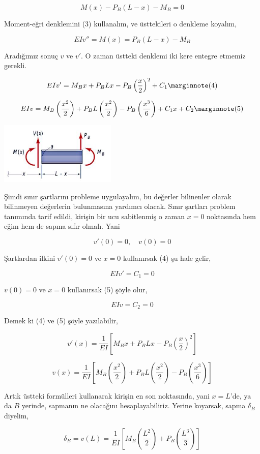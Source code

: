 \documentclass[12pt,fleqn]{article}\usepackage{../../common}
\begin{document}
$$
M(x) - P_B(L-x) - M_B = 0
$$

Moment-eğri denklemini (3) kullanalım, ve üsttekileri o denkleme koyalım,

$$
EIv'' = M(x) = P_B(L-x) - M_B
$$

Aradığımız sonuç $v$ ve $v'$. O zaman üstteki denklemi iki kere entegre etmemiz
gerekli.

$$
EI v' = M_B x + P_B Lx - P_B \left( \frac{x}{2} \right)^2 + C_1
\mlabel{4}
$$

$$
EIv = M_B \left( \frac{x^2}{2} \right) +
P_B L  \left( \frac{x^2}{2} \right) -
P_B \left( \frac{x^3}{6} \right) +
C_1 x + C_2
\mlabel{5}
$$

\includegraphics[width=15em]{phy_020_strs_05_05.jpg}

Şimdi sınır şartlarını probleme uygulayalım, bu değerler bilinenler
olarak bilinmeyen değerlerin bulunmasına yardımcı olacak. Sınır şartları
problem tanımında tarif edildi, kirişin bir ucu sabitlenmiş o zaman
$x=0$ noktasında hem eğim hem de sapma sıfır olmalı. Yani

$$
v'(0) = 0,\quad v(0) = 0
$$

Şartlardan ilkini $v'(0)=0$ ve $x=0$ kullanırsak (4) şu hale gelir,

$$
EI v' = C_1 = 0
$$

$v(0)=0$ ve $x=0$ kullanırsak (5) şöyle olur,

$$
EIv = C_2 = 0
$$

Demek ki (4) ve (5) şöyle yazılabilir,

$$
v'(x) = \frac{1}{EI} \left[
  M_B x + P_B Lx - P_B \left( \frac{x}{2} \right)^2
\right]
$$

$$
v(x) = \frac{1}{EI} \left[
  M_B \left( \frac{x^2}{2} \right) + 
  P_B L  \left( \frac{x^2}{2} \right) -
  P_B \left( \frac{x^3}{6} \right)
\right]
$$

Artık üstteki formülleri kullanarak kirişin en son noktasında, yani $x=L$'de, ya
da $B$ yerinde, sapmanın ne olacağını hesaplayabiliriz. Yerine koyarsak, sapma
$\delta_B$ diyelim,

$$
\delta_B = v(L) =
\frac{1}{EI} \left[
M_B \left( \frac{L^2}{2}  \right) +
P_B \left( \frac{L^3}{3}  \right)
\right]
$$
\end{document}

